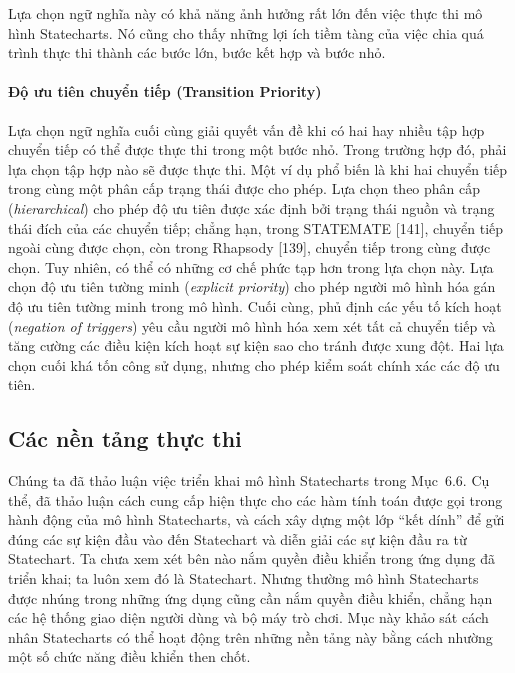 Lựa chọn ngữ nghĩa này có khả năng ảnh hưởng rất lớn đến việc thực thi mô hình Statecharts. Nó cũng cho thấy những lợi ích tiềm tàng của việc chia quá trình thực thi thành các bước lớn, bước kết hợp và bước nhỏ.

\paragraph{Độ ưu tiên chuyển tiếp (Transition Priority)}
Lựa chọn ngữ nghĩa cuối cùng giải quyết vấn đề khi có hai hay nhiều tập hợp chuyển tiếp có thể được thực thi trong một bước nhỏ. Trong trường hợp đó, phải lựa chọn tập hợp nào sẽ được thực thi. Một ví dụ phổ biến là khi hai chuyển tiếp trong cùng một phân cấp trạng thái được cho phép. Lựa chọn theo phân cấp (\emph{hierarchical}) cho phép độ ưu tiên được xác định bởi trạng thái nguồn và trạng thái đích của các chuyển tiếp; chẳng hạn, trong STATEMATE [141], chuyển tiếp ngoài cùng được chọn, còn trong Rhapsody [139], chuyển tiếp trong cùng được chọn. Tuy nhiên, có thể có những cơ chế phức tạp hơn trong lựa chọn này. Lựa chọn độ ưu tiên tường minh (\emph{explicit priority}) cho phép người mô hình hóa gán độ ưu tiên tường minh trong mô hình. Cuối cùng, phủ định các yếu tố kích hoạt (\emph{negation of triggers}) yêu cầu người mô hình hóa xem xét tất cả chuyển tiếp và tăng cường các điều kiện kích hoạt sự kiện sao cho tránh được xung đột. Hai lựa chọn cuối khá tốn công sử dụng, nhưng cho phép kiểm soát chính xác các độ ưu tiên.


\subsection{Các nền tảng thực thi}
Chúng ta đã thảo luận việc triển khai mô hình Statecharts trong Mục~6.6. Cụ thể, đã thảo luận cách cung cấp hiện thực cho các hàm tính toán được gọi trong hành động của mô hình Statecharts, và cách xây dựng một lớp ``kết dính'' để gửi đúng các sự kiện đầu vào đến Statechart và diễn giải các sự kiện đầu ra từ Statechart. Ta chưa xem xét bên nào nắm quyền điều khiển trong ứng dụng đã triển khai; ta luôn xem đó là Statechart. Nhưng thường mô hình Statecharts được nhúng trong những ứng dụng cũng cần nắm quyền điều khiển, chẳng hạn các hệ thống giao diện người dùng và bộ máy trò chơi. Mục này khảo sát cách nhân Statecharts có thể hoạt động trên những nền tảng này bằng cách nhường một số chức năng điều khiển then chốt.

